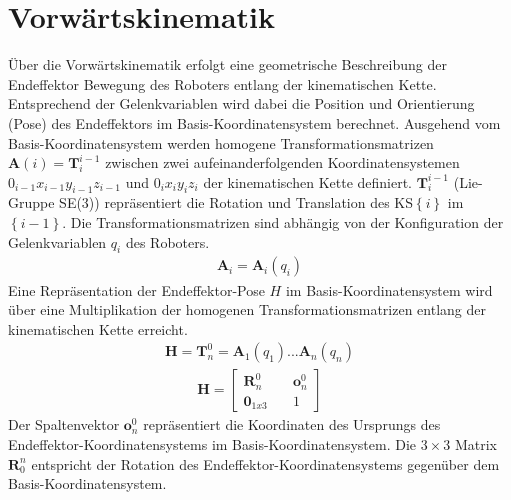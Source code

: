 \section{Vorwärtskinematik}
Über die Vorwärtskinematik erfolgt eine geometrische Beschreibung der Endeffektor Bewegung des Roboters entlang der kinematischen Kette. Entsprechend der Gelenkvariablen wird dabei die Position und Orientierung (Pose) des Endeffektors im Basis-Koordinatensystem berechnet. Ausgehend vom Basis-Koordinatensystem werden homogene Transformationsmatrizen $\bm{A}(i) = \bm{T}^{i-1}_i$ zwischen zwei aufeinanderfolgenden Koordinatensystemen $0_{i-1}x_{i-1}y_{i-1}z_{i-1}$ und $0_ix_iy_iz_i$ der kinematischen Kette definiert. $\bm{T}^{i-1}_i$ (Lie-Gruppe SE(3)) repräsentiert die  Rotation und Translation des KS$\left\{i\right\}$ im $\left\{i-1\right\}$. Die Transformationsmatrizen sind abhängig von der Konfiguration der Gelenkvariablen $q_i$ des Roboters.
\begin{align}
	\bm{A}_i = \bm{A}_i(q_i)
\end{align}
Eine Repräsentation der Endeffektor-Pose $H$ im Basis-Koordinatensystem wird über eine Multiplikation der homogenen Transformationsmatrizen entlang der kinematischen Kette erreicht. 
\begin{align}
	\label{eqn:homogeneTransformation}
	\bm{H} = \bm{T}^0_n = \bm{A}_1(q_1) ... \bm{A}_n(q_n)
\end{align}
\begin{align}
	\bm{H} =\begin{bmatrix} \bm{R}^0_n &\quad \bm{o}^0_n\\ \mathbf{0}_{1x3} &\quad 1\end{bmatrix}
\end{align}
Der Spaltenvektor $\bm{o}^0_n$ repräsentiert die Koordinaten des Ursprungs des Endeffektor-Koordinatensystems im Basis-Koordinatensystem. Die $3 \times 3 $ Matrix $\bm{R}^n_0$ entspricht der Rotation des Endeffektor-Koordinatensystems gegenüber dem Basis-Koordinatensystem. \autocite{Spong.2020} 
%
